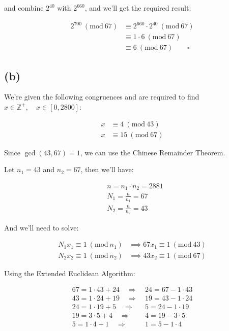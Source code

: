 \documentclass{article}
\newcommand{\modwos}[1]{\ (\mathrm{mod}\ #1)}
\begin{document}
and combine $2^{40}$ with $2^{660}$, and we'll get the required result:

\begin{align*}
    2^{700} \modwos{67}
    &\equiv 2^{660} \cdot 2^{40} \modwos{67} \\
    &\equiv 1 \cdot 6 \modwos{67} \\
    &\equiv 6 \modwos{67} \qquad \square
\end{align*}

\subsection*{(b)}

We're given the following congruences and are required to find $x \in \mathbb{Z}^+, \quad x \in [0, 2800]$:

\begin{align*}
    x &\equiv 4 \modwos{43} \\
    x &\equiv 15 \modwos{67} 
\end{align*}

Since $\gcd (43, 67) = 1$, we can use the Chinese Remainder Theorem.
\bigskip

Let $n_1 = 43$ and $n_2 = 67$, then we'll have:

\begin{align*}
    &n = n_1 \cdot n_2 = 2881 \\
    &N_1 = \frac{n}{n_1} = 67 \\
    &N_2 = \frac{n}{n_2} = 43 
\end{align*}

And we'll need to solve:

\begin{align*}
    N_1 x_1 \equiv 1 \modwos{n_1} &\implies 67 x_1 \equiv 1 \modwos{43} \\
    N_2 x_2 \equiv 1 \modwos{n_2} &\implies 43 x_2 \equiv 1 \modwos{67}
\end{align*}

Using the Extended Euclidean Algorithm:

\begin{align*}
    67 = 1 \cdot 43 + 24 \quad \Rightarrow &\ 24 = 67 - 1 \cdot 43 \\
    43 = 1 \cdot 24 + 19 \quad \Rightarrow &\ 19 = 43 - 1 \cdot 24 \\
    24 = 1 \cdot 19 + 5 \quad \Rightarrow &\ 5 = 24 - 1 \cdot 19 \\
    19 = 3 \cdot 5 + 4 \quad \Rightarrow &\ 4 = 19 - 3 \cdot 5 \\
    5 = 1 \cdot 4 + 1 \quad \Rightarrow &\ 1 = 5 - 1 \cdot 4
\end{align*}
\end{document}

